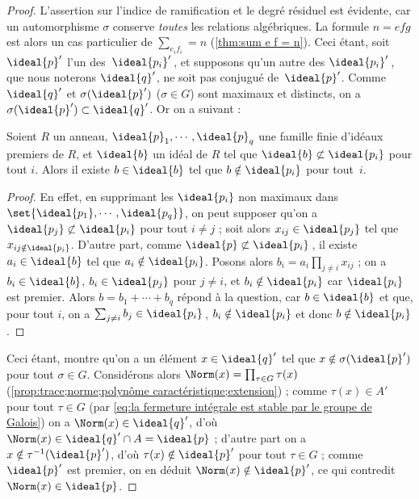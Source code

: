\documentclass[11pt, %
  title in boldface,
  theorem in new line,
  theorem numbering = section,
  number theorems separately,
  simple name,
]{beaulivre}
\begin{document}
    \begin{proof}
        L'assertion sur l'indice de ramification et le degré résiduel est évidente, car un automorphisme \( \sigma \) conserve \emph{toutes} les relations algébriques. La formule \( n = efg \) est alors un cas particulier de \( \sum_{e_i f_i} = n \) (\cref{thm:sum e f = n}). Ceci étant, soit \( \ideal{p}' \) l'un des~\( \ideal{p_i}' \)\,, et supposons qu'un autre des \( \ideal{p_i}' \)\,, que nous noterons \( \ideal{q}' \), ne soit pas conjugué de~\( \ideal{p}' \). Comme \( \ideal{q}' \) et \( \sigma(\ideal{p}') \) (\( \sigma \in G \)) sont maximaux et distincts, on a \( \sigma(\ideal{p}') \subset \ideal{q}' \). Or on a  suivant :
        \begin{lemma}\label{lem:évitement des idéaux premiers}
            Soient \( R \) un anneau, \( \ideal{p}_1, \cdots, \ideal{p}_q \) une famille finie d'idéaux premiers de \( R \), et \( \ideal{b} \) un idéal de \( R \) tel que \( \ideal{b} \not\subset \ideal{p_i} \) pour tout \( i \). Alors il existe \( b \in \ideal{b} \) tel que \( b \notin \ideal{p_i} \) pour tout~\( i \).
        \end{lemma}
        \begin{proof}
            En effet, en supprimant les \( \ideal{p_i} \) non maximaux dans \( \set{\ideal{p_1}, \cdots, \ideal{p_q}} \), on peut supposer qu'on a \( \ideal{p_j} \not\subset \ideal{p_i} \) pour tout \( i \neq j \) ; soit alors \( x_{ij} \in \ideal{p_j} \) tel que \( x_{ij \notin \ideal{p_i}} \). D'autre part, comme \( \ideal{p} \not\subset \ideal{p_i} \)\,, il existe \( a_i \in \ideal{b} \) tel que \( a_i \notin \ideal{p_i} \). Posons alors \( b_i = a_i \prod_{j \neq i} x_{ij} \) ; on a \( b_i \in \ideal{b} \), \( b_i \in \ideal{p_j} \) pour \( j \neq i \), et \( b_i \notin \ideal{p_i} \) car \( \ideal{p_i} \) est premier. Alors \( b = b_1 + \cdots + b_q \) répond à la question, car \( b \in \ideal{b} \) et que, pour tout \( i \), on a \( \sum_{j \neq i} b_j \in \ideal{p_i} \)\,, \( b_i \notin \ideal{p_i} \) et donc \( b \notin \ideal{p_i} \).
        \end{proof}
        Ceci étant,  montre qu'on a un élément \( x \in \ideal{q}' \) tel que \( x \notin \sigma(\ideal{p}') \) pour tout \( \sigma \in G \). Considérons alors \( \Norm(x) = \prod_{\tau \in G} \tau(x) \) (\cref{prop:trace;norme;polynôme caractéristique;extension}) ; comme \( \tau(x) \in A' \) pour tout \( \tau \in G \) (par \eqref{eq:la fermeture intégrale est stable par le groupe de Galois}) on a \( \Norm(x) \in \ideal{q}' \), d'où \( \Norm(x) \in \ideal{q}' \cap A = \ideal{p} \) ; d'autre part on a \( x \notin \tau^{-1}(\ideal{p}') \), d'où \( \tau(x) \notin \ideal{p}' \) pour tout \( \tau \in G \) ; comme \( \ideal{p}' \) est premier, on en déduit \( \Norm(x) \notin \ideal{p}' \), ce qui contredit \( \Norm(x) \in \ideal{p} \).
    \end{proof}
\end{document}
